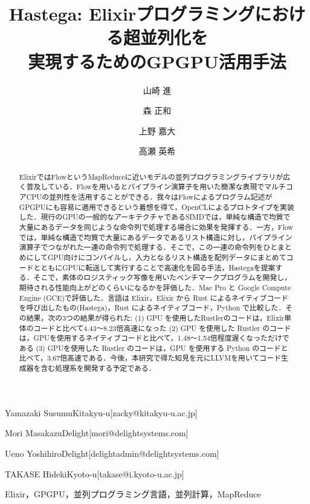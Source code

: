 \documentclass[submit,PRO]{ipsj}
\begin{document}
\title{Hastega: Elixirプログラミングにおける超並列化を\\実現するためのGPGPU活用手法}



\author{山崎 進}{Yamazaki Susumu}{Kitakyu-u}[zacky@kitakyu-u.ac.jp]
\author{森 正和}{Mori Masakazu}{Delight}[mori@delightsystems.com]
\author{上野 嘉大}{Ueno Yoshihiro}{Delight}[delightadmin@delightsystems.com]
\author{高瀬 英希}{TAKASE Hideki}{Kyoto-u}[takase@i.kyoto-u.ac.jp]

\begin{abstract}
ElixirではFlowというMapReduceに近いモデルの並列プログラミングライブラリが広く普及している．Flowを用いるとパイプライン演算子を用いた簡潔な表現でマルチコアCPUの並列性を活用することができる．我々はFlowによるプログラム記述がGPGPUにも容易に適用できるという着想を得て，OpenCLによるプロトタイプを実装した．現行のGPUの一般的なアーキテクチャであるSIMDでは，単純な構造で均質で大量にあるデータを同じような命令列で処理する場合に効果を発揮する．一方，Flowでは，単純な構造で均質で大量にあるデータであるリスト構造に対し，パイプライン演算子でつながれた一連の命令列で処理する．そこで，この一連の命令列をひとまとめにしてGPU向けにコンパイルし，入力となるリスト構造を配列データにまとめてコードとともにGPUに転送して実行することで高速化を図る手法，Hastegaを提案する．そこで，素体のロジスティック写像を用いたベンチマークプログラムを開発し，期待される性能向上がどのくらいになるかを評価した．Mac Pro と Google Compute Engine (GCE)で評価した．言語は Elixir，Elixir から Rust によるネイティブコードを呼び出したもの(Hastega)，Rust によるネイティブコード，Python で比較した．その結果，次の3つの結果が得られた: (1) GPU を使用したRustlerのコードは，Elixir単体のコードと比べて4.43〜8.23倍高速になった (2) GPU を使用した Rustler のコードは，GPUを使用するネイティブコードと比べて，1.48〜1.54倍程度遅くなっただけである (3) GPUを使用した Rustler のコードは，GPU を使用する Python のコードと比べて，3.67倍高速である．今後，本研究で得た知見を元にLLVMを用いてコード生成器を含む処理系を開発する予定である．
\end{abstract}


\begin{jkeyword}
Elixir，GPGPU，並列プログラミング言語，並列計算，MapReduce
\end{jkeyword}
\end{document}

